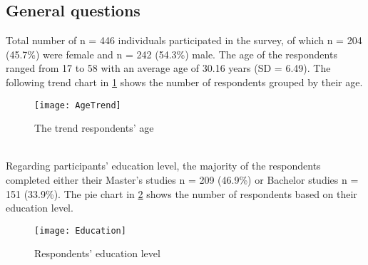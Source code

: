 \subsection{General questions}
Total number of n = 446 individuals participated in the survey, of which n = 204 (45.7\%) were female and n = 242 (54.3\%) male. The age of the respondents ranged from 17 to 58 with an average age of 30.16 years (SD = 6.49). The  following trend chart in \ref{fig:AgeTrend} shows the number of respondents grouped by their age. 
\begin{figure}[h]
    \centering
    \texttt{[image: AgeTrend]}
    \caption{The trend respondents' age}
    \label{fig:AgeTrend}
\end{figure}\\\pagebreak
Regarding participants' education level, the majority of the respondents completed either their Master's studies n = 209 (46.9\%) or Bachelor studies n = 151 (33.9\%). The pie chart in \ref{fig:Education} shows the number of respondents based on their education level. 
\begin{figure}[h]
    \centering
    \texttt{[image: Education]}
    \caption{Respondents' education level}
    \label{fig:Education}
\end{figure}
